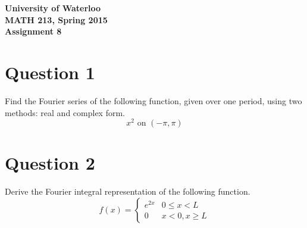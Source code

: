 \documentclass[12pt]{article}
\begin{document}
\begin{center}
{\Large\bf University of Waterloo}\\
\vspace{3mm}
{\Large\bf MATH 213, Spring 2015}\\
\vspace{2mm}
{\Large\bf Assignment 8}\\
\end{center}

\section*{Question 1}
Find the Fourier series of the following function, given over one period, using two methods: real and complex form.
$$x^2 \text{ on } (-\pi, \pi)$$

\section*{Question 2}
Derive the Fourier integral representation of the following function.
$$f(x) =
\begin{cases}
e^{2x} & 0 \leq x < L \\
0 & x < 0, x \geq L
\end{cases}$$
\end{document}
